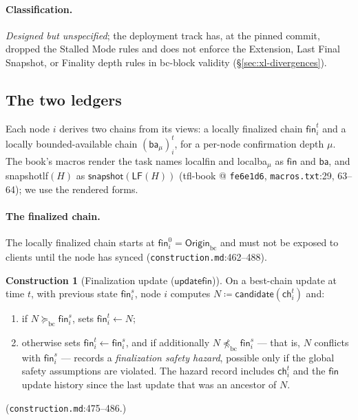 \documentclass[11pt,a4paper]{article}
\theoremstyle{definition}
\newtheorem{construction}[theorem]{Construction}
\begin{document}
\paragraph{Classification.} \emph{Designed but unspecified}; the
deployment track has, at the pinned commit, dropped the Stalled Mode
rules and does not enforce the Extension, Last Final Snapshot, or
Finality depth rules in bc-block validity (\S\ref{sec:xl-divergences}).

\subsection{The two ledgers}\label{sec:xl-ledgers}

Each node $i$ derives two chains from its views: a locally finalized
chain $\mathsf{fin}_i^t$ and a locally bounded-available chain
$(\mathsf{ba}_{\mu})_i^t$, for a per-node confirmation depth $\mu$. The
book's macros render the task names \textsf{localfin} and
\textsf{localba}$_{\mu}$ as $\mathsf{fin}$ and $\mathsf{ba}$, and
\textsf{snapshotlf}$(H)$ as
$\mathsf{snapshot}(\mathsf{LF}(H))$ (tfl-book @ \texttt{fe6e1d6},
\texttt{macros.txt}:29, 63--64); we use the rendered forms.

\paragraph{The finalized chain.} The locally finalized chain starts at
$\mathsf{fin}_i^0 = \mathsf{Origin}_{\mathrm{bc}}$ and must not be
exposed to clients until the node has synced
(\texttt{construction.md}:462--488).

\begin{construction}[Finalization update
($\mathsf{updatefin}$)]\label{def:xl-updatefin}
On a best-chain update at time $t$, with previous state
$\mathsf{fin}_i^s$, node $i$ computes $N \coloneqq
\mathsf{candidate}(\mathsf{ch}_i^t)$ and:
\begin{enumerate}[label=(\roman*)]
\item if $N \succeq_{\mathrm{bc}} \mathsf{fin}_i^s$, sets
  $\mathsf{fin}_i^t \leftarrow N$;
\item otherwise sets $\mathsf{fin}_i^t \leftarrow \mathsf{fin}_i^s$, and
  if additionally $N \not\preceq_{\mathrm{bc}} \mathsf{fin}_i^s$ --- that
  is, $N$ conflicts with $\mathsf{fin}_i^s$ --- records a
  \emph{finalization safety hazard}, possible only if the global safety
  assumptions are violated. The hazard record includes $\mathsf{ch}_i^t$
  and the $\mathsf{fin}$ update history since the last update that was an
  ancestor of $N$.
\end{enumerate}
(\texttt{construction.md}:475--486.)
\end{construction}
\end{document}
